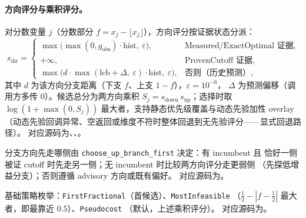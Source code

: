 \paragraph{方向评分与乘积评分。}
对分数变量 $j$（分数部分 $f=x_j-\lfloor x_j\rfloor$），方向评分按证据状态分派：
\begin{equation}
  s_{\mathrm{dir}}=
  \begin{cases}
    \max\bigl(\max(0,g_{\mathrm{obs}})\cdot\mathrm{hist},\ \varepsilon\bigr),
      & \text{Measured/ExactOptimal 证据},\\
    +\infty, & \text{ProvenCutoff 证据},\\
    \max\bigl(d\cdot\max(\mathrm{lcb}+\Delta,\ \varepsilon)\cdot
      \mathrm{hist},\ \varepsilon\bigr), & \text{否则（历史预测）},
  \end{cases}
\end{equation}
其中 $d$ 为该方向分支距离（下支 $f$、上支 $1-f$），$\varepsilon=10^{-6}$，
$\Delta$ 为预测偏移（调用方多传 0）。候选总分为两方向乘积
$S_j=s_{\mathrm{down}}\,s_{\mathrm{up}}$；选择时取
$\log(1+\max(0,S_j))$ 最大者，支持静态优先级覆盖与动态先验加性 overlay
（动态先验回调异常、空返回或维度不符时整体回退到无先验评分——显式回退路径）。
对应源码为、、。

分支方向先走哪侧由 \texttt{choose\_up\_branch\_first} 决定：有 incumbent 且
恰好一侧被证 cutoff 时先走另一侧；无 incumbent 时比较两方向评分走更弱侧
（先探低增益分支）；否则遵循 advisory 方向或既有偏好。
对应源码为。

基础策略枚举：\texttt{FirstFractional}（首候选）、\texttt{MostInfeasible}
（$\tfrac12-|f-\tfrac12|$ 最大者，即最靠近 $0.5$）、\texttt{Pseudocost}
（默认，上述乘积评分）。
对应源码为。

